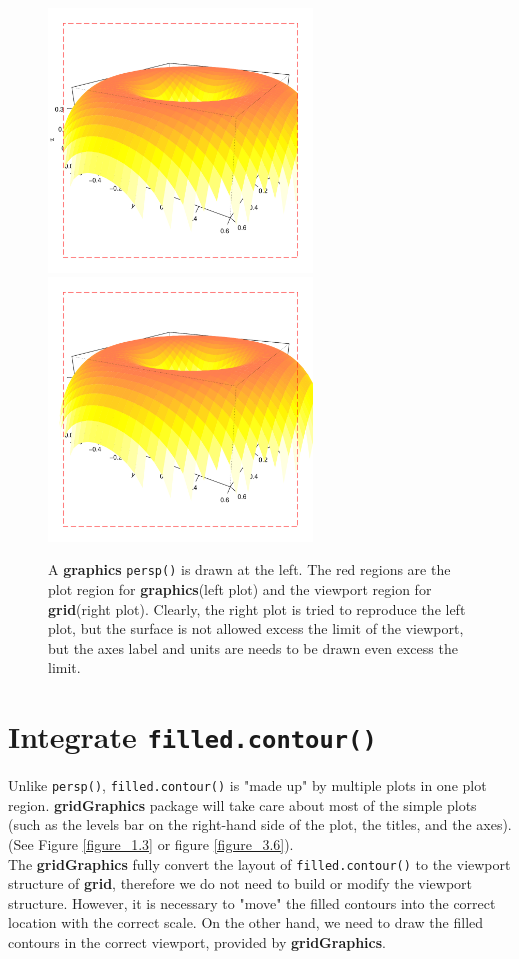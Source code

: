 \documentclass[11pt]{report}
\begin{document}
\begin{figure}[h]
	\begin{center}
		\includegraphics[height = 7cm, width = 7cm]{figure/gridGraphics_persp_demo_viewport3_1.pdf}
		\includegraphics[height = 7cm, width = 7cm]{figure/gridGraphics_persp_demo_viewport3_2.pdf}
		\caption{A \textbf{graphics} \texttt{persp()} is drawn at the left. The red regions are the plot region for \textbf{graphics}(left plot) and the viewport region for \textbf{grid}(right plot). Clearly, the right plot is tried to reproduce the left plot, but the surface is not allowed excess the limit of the viewport, but the axes label and units are needs to be drawn even excess the limit.}
		\label{figure_4.5}
	\end{center}
\end{figure}

\section{Integrate \texttt{filled.contour()}}
Unlike \texttt{persp()}, \texttt{filled.contour()} is "made up" by multiple plots in one plot region. \textbf{gridGraphics} package will take care about most of the simple plots (such as the levels bar on the right-hand side of the plot, the titles, and the axes). (See Figure \ref{figure_1.3} or figure \ref{figure_3.6}).\\
The \textbf{gridGraphics} fully convert the layout of \texttt{filled.contour()} to the viewport structure of \textbf{grid}, therefore we do not need to build or modify the viewport structure. However, it is necessary to "move" the filled contours into the correct location with the correct scale. On the other hand, we need to draw the filled contours in the correct viewport, provided by \textbf{gridGraphics}.\\
\end{document}
